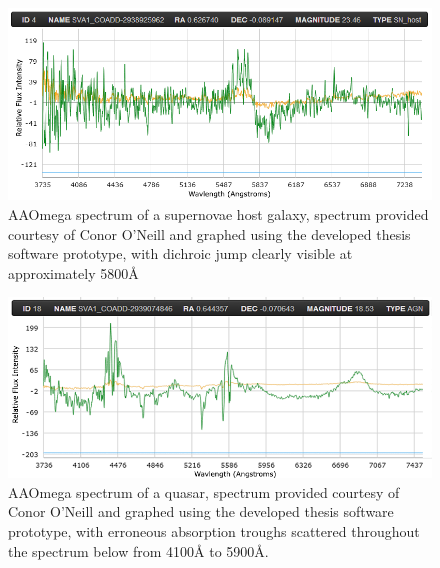 \documentclass[titlesmallcaps, examinerscopy, copyrightpage]{uqthesis}
\begin{document}
\begin{figure}[ht!]
\includegraphics[width=1\textwidth]{images/jump.PNG} 
\centering
\caption{AAOmega spectrum of a supernovae host galaxy, spectrum provided courtesy of Conor O'Neill and graphed using the developed thesis software prototype, with dichroic jump clearly visible at approximately 5800{\AA}}
\label{fig:jump}
\end{figure}

\begin{figure}[ht!]
\includegraphics[width=1\textwidth]{images/dust.PNG} 
\centering
\caption{AAOmega spectrum of a quasar, spectrum provided courtesy of Conor O'Neill and graphed using the developed thesis software prototype, with erroneous absorption troughs scattered throughout the spectrum below from 4100{\AA} to 5900{\AA}.}
\label{fig:dust}
\end{figure}
\end{document}
